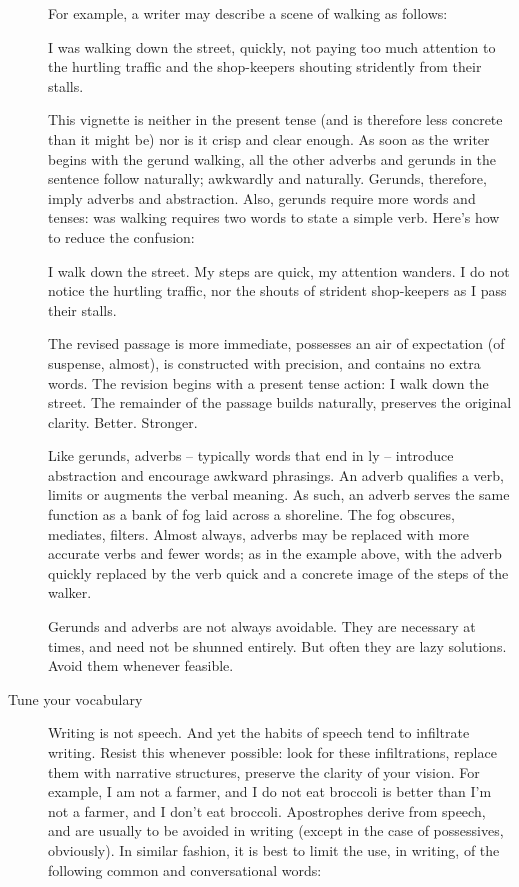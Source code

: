\documentclass[letterpaper,10pt,headsepline]{scrreprt}
\begin{document}
\begin{description}
For example, a writer may describe a scene of walking as follows:
\vspace{1em}

\textsf{I was walking down the street, quickly, not paying too much attention to the hurtling traffic and the shop-keepers shouting stridently from their stalls.}
\vspace{1em}

This vignette is neither in the present tense (and is therefore less concrete than it might be) nor is it crisp and clear enough. As soon as the writer begins with the gerund walking, all the other adverbs and gerunds in the sentence follow naturally; awkwardly and naturally. Gerunds, therefore, imply adverbs and abstraction. Also, gerunds require more words and tenses: \textsf{was walking} requires two words to state a simple verb. Here's how to reduce the confusion:
\vspace{1em}

\textsf{I walk down the street. My steps are quick, my attention wanders. I do not notice the hurtling traffic, nor the shouts of strident shop-keepers as I pass their stalls.}
\vspace{1em}

The revised passage is more immediate, possesses an air of expectation (of suspense, almost), is constructed with precision, and contains no extra words. The revision begins with a present tense action: I walk down the street. The remainder of the passage builds naturally, preserves the original clarity. Better. Stronger.

Like gerunds, adverbs -- typically words that end in \textsf{ly} --  introduce abstraction and encourage awkward phrasings. An adverb qualifies a verb, limits or augments the verbal meaning. As such, an adverb serves the same function as a bank of fog laid across a shoreline. The fog obscures, mediates, filters. Almost always, adverbs may be replaced with more accurate verbs and fewer words; as in the example above, with the adverb quickly replaced by the verb quick and a concrete image of the steps of the walker.

Gerunds and adverbs are not always avoidable. They are necessary at times, and need not be shunned entirely. But often they are lazy solutions. Avoid them whenever feasible.


\item [Tune your vocabulary] Writing is not speech. And yet the habits of speech tend to infiltrate writing. Resist this whenever possible: look for these infiltrations, replace them with narrative structures, preserve the clarity of your vision. For example, \textsf{I am not a farmer, and I do not eat broccoli} is better than \textsf{I'm not a farmer, and I don't eat broccoli}. Apostrophes derive from speech, and are usually to be avoided in writing (except in the case of possessives, obviously). In similar fashion, it is best to limit the use, in writing, of the following common and conversational words:
\vspace{1em}


\end{description}
\end{document}

